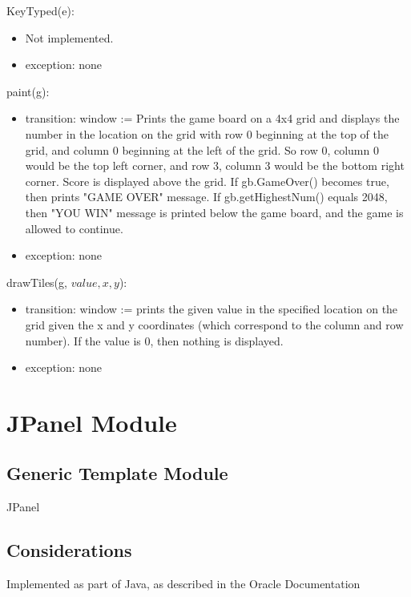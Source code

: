 \documentclass[12pt]{article}
\begin{document}
\noindent KeyTyped(e):
\begin{itemize}
    \item Not implemented.
    \item exception: none
\end{itemize}

\noindent paint(g):
\begin{itemize}
    \item transition: window := Prints the game board on a 4x4 grid and
    displays the number in the location on the grid with row 0 beginning at
    the top of the grid, and column 0 beginning at the left of the grid. So
    row 0, column 0 would be the top left corner, and row 3, column 3 would
    be the bottom right corner. Score is displayed above the grid. If
    gb.GameOver() becomes true, then prints "GAME OVER" message. If
    gb.getHighestNum() equals 2048, then "YOU WIN" message is printed below
    the game board, and the game is allowed to continue.
    \item exception: none
\end{itemize}

\noindent drawTiles(g, $value, x, y$):
\begin{itemize}
    \item transition: window := prints the given value in the specified
    location on the grid given the x and y coordinates (which correspond to
    the column and row number). If the value is 0, then nothing is displayed.
    \item exception: none
\end{itemize}

\newpage

\section*{JPanel Module}

\subsection*{Generic Template Module}

JPanel

\subsection*{Considerations}

Implemented as part of Java, as described in the Oracle Documentation

\newpage
\end{document}
